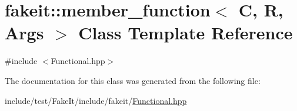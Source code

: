 \hypertarget{classfakeit_1_1member__function}{}\section{fakeit\+::member\+\_\+function$<$ C, R, Args $>$ Class Template Reference}
\label{classfakeit_1_1member__function}


{\ttfamily \#include $<$Functional.\+hpp$>$}



The documentation for this class was generated from the following file\+:\begin{DoxyCompactItemize}
\item 
include/test/\+Fake\+It/include/fakeit/\mbox{\hyperlink{Functional_8hpp}{Functional.\+hpp}}\end{DoxyCompactItemize}
